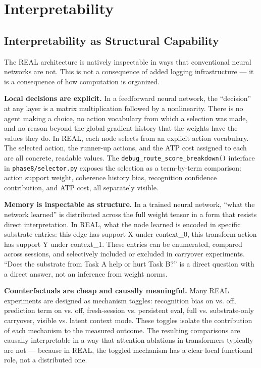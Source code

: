 \documentclass[letterpaper]{article}
\begin{document}
\section{Interpretability}

\subsection{Interpretability as Structural Capability}

The REAL architecture is natively inspectable in ways that conventional neural networks are not. This is not a consequence of added logging infrastructure — it is a consequence of how computation is organized.

\textbf{Local decisions are explicit.} In a feedforward neural network, the ``decision'' at any layer is a matrix multiplication followed by a nonlinearity. There is no agent making a choice, no action vocabulary from which a selection was made, and no reason beyond the global gradient history that the weights have the values they do. In REAL, each node selects from an explicit action vocabulary. The selected action, the runner-up actions, and the ATP cost assigned to each are all concrete, readable values. The \texttt{debug\_route\_score\_breakdown()} interface in \texttt{phase8/selector.py} exposes the selection as a term-by-term comparison: action support weight, coherence history bias, recognition confidence contribution, and ATP cost, all separately visible.

\textbf{Memory is inspectable as structure.} In a trained neural network, ``what the network learned'' is distributed across the full weight tensor in a form that resists direct interpretation. In REAL, what the node learned is encoded in specific substrate entries: this edge has support X under context\_0, this transform action has support Y under context\_1. These entries can be enumerated, compared across sessions, and selectively included or excluded in carryover experiments. ``Does the substrate from Task A help or hurt Task B?'' is a direct question with a direct answer, not an inference from weight norms.

\textbf{Counterfactuals are cheap and causally meaningful.} Many REAL experiments are designed as mechanism toggles: recognition bias on vs. off, prediction term on vs. off, fresh-session vs. persistent eval, full vs. substrate-only carryover, visible vs. latent context mode. These toggles isolate the contribution of each mechanism to the measured outcome. The resulting comparisons are causally interpretable in a way that attention ablations in transformers typically are not — because in REAL, the toggled mechanism has a clear local functional role, not a distributed one.
\end{document}
